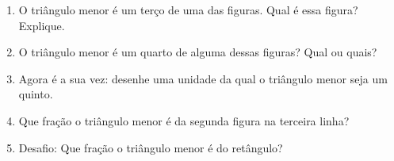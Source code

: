 \begin{atividade}{}\label{chap1-ativ5}

\begin{enumerate}
\item O triângulo menor é um terço de uma das figuras. Qual é essa figura? Explique. 
\item O triângulo menor é um quarto de alguma dessas figuras? Qual ou quais?
\item Agora é a sua vez: desenhe uma unidade da qual o triângulo menor seja um quinto.  
\item Que fração o triângulo menor é da segunda figura na terceira linha?
\item Desafio: Que fração o triângulo menor é do retângulo? 
\end{enumerate}



\end{atividade}
